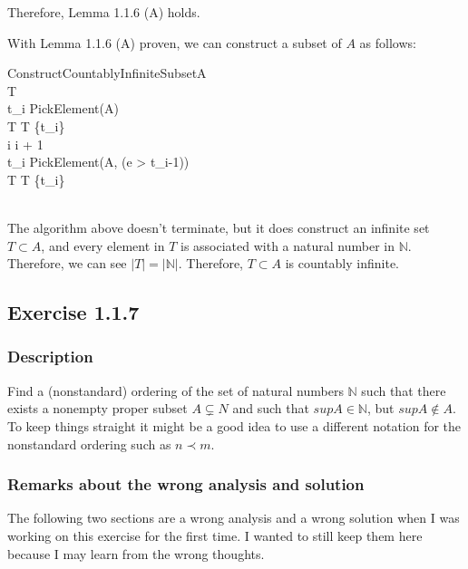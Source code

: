 \documentclass[12pt, letterpaper, oneside]{book}
\begin{document}
Therefore, Lemma 1.1.6 (A) holds.

With Lemma 1.1.6 (A) proven, we can construct a subset of $A$ as follows:

\begin{pseudocode}[ruled]{ConstructCountablyInfiniteSubset}{A}
   \\
  T \GETS \emptyset \\
  t_i \GETS PickElement(A) \\
  T \GETS T \cup \{t_i\} \\
  \WHILE \TRUE \DO
  \BEGIN
  i \GETS i + 1 \\
  t_i \GETS PickElement(A, (e > t_{i-1})) \\
  T \GETS T \cup \{t_i\} \\
  \END
  \\
\end{pseudocode}

The algorithm above doesn't terminate, but it does construct an infinite set $T \subset A$, and every element in $T$ is
associated with a natural number in $\mathbb{N}$. Therefore, we can see $|T| = |\mathbb{N}|$. Therefore, $T \subset A$
is countably infinite.

\subsection{Exercise 1.1.7}

\subsubsection{Description}

Find a (nonstandard) ordering of the set of natural numbers $\mathbb{N}$ such that there exists a nonempty proper
subset $A \subsetneq N$ and such that $sup A \in \mathbb{N}$, but $sup A \notin A$. To keep things straight it might be
a good idea to use a different notation for the nonstandard ordering such as $n \prec m$.

\subsubsection{Remarks about the wrong analysis and solution}

The following two sections are a wrong analysis and a wrong solution when I was working on this exercise for the first
time. I wanted to still keep them here because I may learn from the wrong thoughts.
\end{document}
